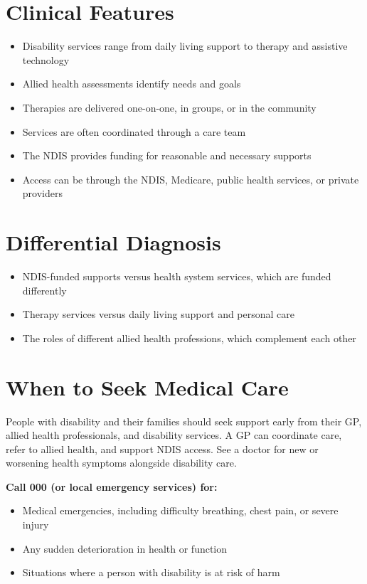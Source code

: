 \section*{Clinical Features}
\begin{itemize}
    \item Disability services range from daily living support to therapy and assistive technology
    \item Allied health assessments identify needs and goals
    \item Therapies are delivered one-on-one, in groups, or in the community
    \item Services are often coordinated through a care team
    \item The NDIS provides funding for reasonable and necessary supports
    \item Access can be through the NDIS, Medicare, public health services, or private providers
\end{itemize}

\section*{Differential Diagnosis}
\begin{itemize}
    \item NDIS-funded supports versus health system services, which are funded differently
    \item Therapy services versus daily living support and personal care
    \item The roles of different allied health professions, which complement each other
\end{itemize}

\section*{When to Seek Medical Care}
People with disability and their families should seek support early from their GP, allied health professionals, and disability services. A GP can coordinate care, refer to allied health, and support NDIS access. See a doctor for new or worsening health symptoms alongside disability care.

\textbf{Call 000 (or local emergency services) for:}
\begin{itemize}
    \item Medical emergencies, including difficulty breathing, chest pain, or severe injury
    \item Any sudden deterioration in health or function
    \item Situations where a person with disability is at risk of harm
\end{itemize}

